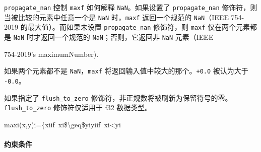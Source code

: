 \documentclass{article}
\begin{document}
\texttt{propagate\_nan} 控制 \texttt{maxf} 如何解释 \texttt{NaN}。如果设置了 \texttt{propagate\_nan} 修饰符，则当被比较的元素中任意一个是 \texttt{NaN} 时，\texttt{maxf} 返回一个规范的 \texttt{NaN}（IEEE 754-2019 的最大值）。而如果未设置 \texttt{propagate\_nan} 修饰符，则 \texttt{maxf} 仅在两个元素都是 \texttt{NaN} 时才返回一个规范的 \texttt{NaN}；否则，它返回非 \texttt{NaN} 元素（IEEE

754-2019's maximumNumber).




如果两个元素都不是 \texttt{NaN}，\texttt{maxf} 将返回输入值中较大的那个。\texttt{+0.0} 被认为大于 \texttt{-0.0}。



如果指定了 \texttt{flush\_to\_zero} 修饰符，非正规数将被刷新为保留符号的零。\texttt{flush\_to\_zero} 修饰符仅适用于 f32 数据类型。



maxi(x,y)i=\{xiif xi\$\textbackslash{}geq\$yiyiif xi<yi




\paragraph{约束条件}
\end{document}
